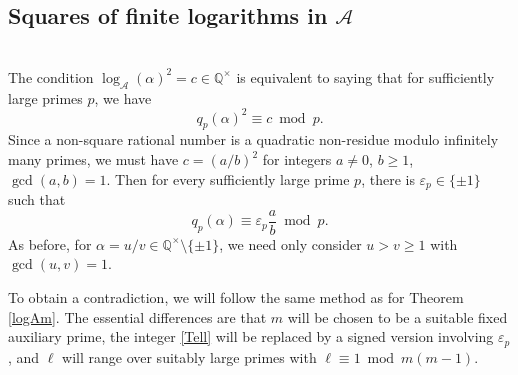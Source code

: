 \documentclass[12pt,reqno]{amsart}
\theoremstyle{remark}
\newcommand{\cA}{\mathcal A}
\begin{document}
\subsection{Squares of finite logarithms in $\cA$} $\,$\\[3pt]
The condition $\log_\cA(\alpha)^2=c\in\mathbb{Q}^\times$ is equivalent to saying that for sufficiently large primes $p$, we have
\[q_p(\alpha)^2\equiv c\bmod p.\]
Since a non-square rational number is a quadratic non-residue modulo infinitely many primes, we must have $c=(a/b)^2$ for integers $a\neq 0$, $b\geq 1$, $\gcd(a,b)=1$. Then for every sufficiently large prime $p$, there is $\varepsilon_p\in\{\pm 1\}$ such that
\[q_p(\alpha)\equiv \varepsilon_p\frac{a}{b}\bmod p.\]
As before, for $\alpha=u/v\in\mathbb{Q}^\times\setminus\{\pm 1\}$, we need only consider $u>v\geq 1$ with $\gcd(u,v)=1$.
\smallskip

To obtain a contradiction, we will follow the same method as for Theorem \ref{logAm}. The essential differences are that $m$ will be chosen to be a suitable fixed auxiliary prime, the integer \eqref{Tell} will be replaced by a signed version involving $\varepsilon_p$, and $\ell$ will range over suitably large primes with $\ell\equiv 1\bmod m(m-1)$.
\end{document}
